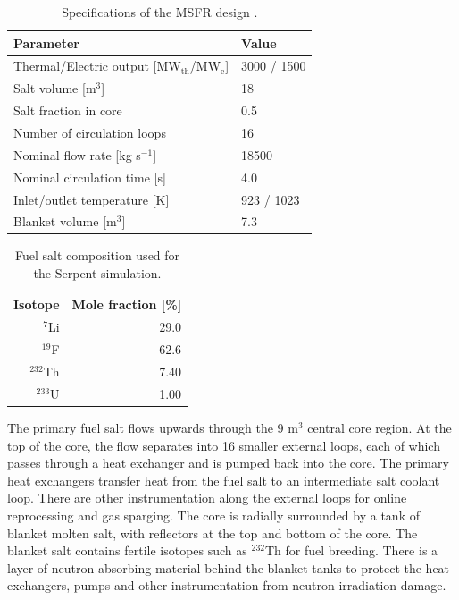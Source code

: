 \documentclass{anstrans}
\begin{document}
\begin{table}[t]
	\caption{Specifications of the \gls{MSFR} design \cite{serp_molten_2014}.}
	\begin{tabular}{ l l }
		\hline
		Parameter & Value \\
		\hline
		Thermal/Electric output [MW$_{\text{th}}$/MW$_{\text{e}}$] & 3000 /
		1500 
		\\
		Salt volume [m$^3$] & 18 \\
		Salt fraction in core & 0.5 \\
		Number of circulation loops & 16 \\
		Nominal flow rate [kg s$^{-1}$] & 18500  \\
		Nominal circulation time [s] & 4.0 \\
		Inlet/outlet temperature [K] & 923 / 1023 \\
		Blanket volume [m$^3$] & 7.3\\
		\hline
	\end{tabular}
	\label{table:msfr}
\end{table}
%
\begin{table}[t]
\centering
\begin{tabular}{rr}
\hline
{Isotope} & {Mole fraction [\%]}\\
\hline
$^7$Li & 29.0\\
$^{19}$F & 62.6\\
$^{232}$Th & 7.40\\
$^{233}$U & 1.00\\
\hline
\end{tabular}
\captionsetup{justification=centering}
\caption{Fuel salt composition used for the Serpent simulation.}
\label{table:fuelsalt}
\end{table}

	The primary fuel salt flows upwards through the 9 m$^3$ central core
	region. At the top of the core, the flow separates into 16 smaller external
	loops, each of which passes through a heat exchanger and is pumped back
	into the core. The primary heat exchangers transfer heat from the fuel salt 
	to an intermediate salt coolant loop. There are other instrumentation along
	the external loops for online reprocessing and gas sparging. The core is
	radially surrounded by a tank of blanket molten salt, with reflectors at
	the top and bottom of the core. The blanket salt contains fertile isotopes
	such as $^{232}$Th for fuel breeding. There is a layer of neutron absorbing
	material behind the blanket tanks to protect the heat exchangers, pumps and
	other instrumentation from neutron irradiation damage.
\end{document}
